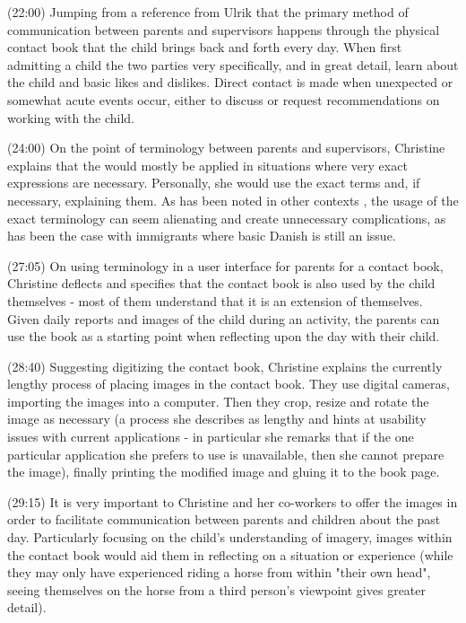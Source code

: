 (22:00) Jumping from a reference from Ulrik that the primary method of communication between parents and supervisors happens through the physical contact book that the child brings back and forth every day. When first admitting a child the two parties very specifically, and in great detail, learn about the child and basic likes and dislikes. Direct contact is made when unexpected or somewhat acute events occur, either to discuss or request recommendations on working with the child.

(24:00) On the point of terminology between parents and supervisors, Christine explains that the would mostly be applied in situations where very exact expressions are necessary. Personally, she would use the exact terms and, if necessary, explaining them. As has been noted in other contexts , the usage of the exact terminology can seem alienating and create unnecessary complications, as has been the case with immigrants where basic Danish is still an issue.

(27:05) On using terminology in a user interface for parents for a contact book, Christine deflects and specifies that the contact book is also used by the child themselves - most of them understand that it is an extension of themselves. Given daily reports and images of the child during an activity, the parents can use the book as a starting point when reflecting upon the day with their child.

(28:40) Suggesting digitizing the contact book, Christine explains the currently lengthy process of placing images in the contact book. They use digital cameras, importing the images into a computer. Then they crop, resize and rotate the image as necessary (a process she describes as lengthy and hints at usability issues with current applications - in particular she remarks that if the one particular application she prefers to use is unavailable, then she cannot prepare the image), finally printing the modified image and gluing it to the book page.

(29:15) It is very important to Christine and her co-workers to offer the images in order to facilitate communication between parents and children about the past day. Particularly focusing on the child's understanding of imagery, images within the contact book would aid them in reflecting on a situation or experience (while they may only have experienced riding a horse from within "their own head", seeing themselves on the horse from a third person's viewpoint gives greater detail).

